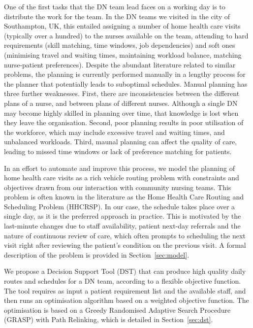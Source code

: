 \documentclass[a4paper,11pt,authoryear]{elsarticle}
\begin{document}
One of the first tasks that the DN team lead faces on a working day is to distribute the work for the team. In the DN teams we visited in the city of Southampton, UK, this entailed assigning a number of home health care visits (typically over a hundred) to the nurses available on the team, attending to hard requirements (skill matching, time windows, job dependencies) and soft ones (minimising travel and waiting times, maintaining workload balance, matching nurse-patient preferences). Despite the abundant literature related to similar problems, the planning is currently performed manually in a lengthy process for the planner that potentially leads to suboptimal schedules. Manual planning has three further weaknesses. First, there are inconsistencies between the different plans of a nurse, and between plans of different nurses. Although a single DN may become highly skilled in planning over time, that knowledge is lost when they leave the organisation. Second, poor planning results in poor utilisation of the workforce, which may include excessive travel and waiting times, and unbalanced workloads. Third, maunal planning can affect the quality of care, leading to missed time windows or lack of preference matching for patients.

In an effort to automate and improve this process, we model the planning of home health care visits as a rich vehicle routing problem with constraints and objectives drawn from our interaction with community nursing teams. This problem is often known in the literature as the Home Health Care Routing and Scheduling Problem (HHCRSP). In our case, the schedule takes place over a single day, as it is the preferred approach in practice. This is motivated by the last-minute changes due to staff availability, patient next-day referrals and the nature of continuous review of care, which often prompts to scheduling the next visit right after reviewing the patient's condition on the previous visit. A formal description of the problem is provided in Section~\ref{sec:model}.

We propose a Decision Support Tool (DST) that can produce high quality daily routes and schedules for a DN team, according to a flexible objective function. The tool requires as input a patient requirement list and the available staff, and then runs an optimisation algorithm based on a weighted objective function. The optimisation is based on a Greedy Randomised Adaptive Search Procedure (GRASP) with Path Relinking, which is detailed in Section~\ref{sec:dst}.
\end{document}

